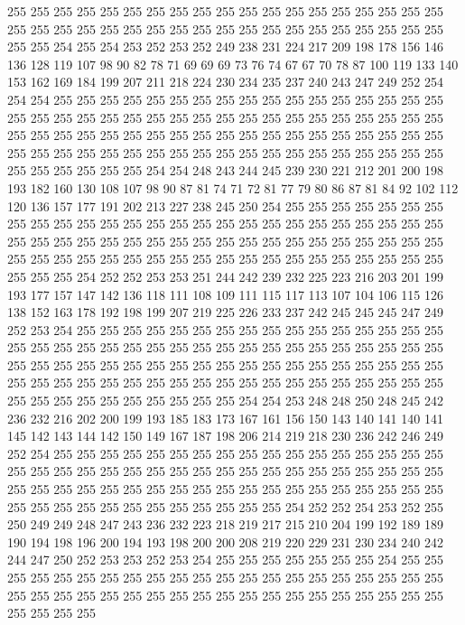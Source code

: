 255 255 255 255 255 255 255 255 255 255 255 255 255 255 255 255 255 255 255 255
255 255 255 255 255 255 255 255 255 255 255 255 255 255 255 255 255 255 255 255
254 255 254 253 252 253 252 249 238 231 224 217 209 198 178 156 146 136 128 119
107 98 90 82 78 71 69 69 69 73 76 74 67 67 70 78 87 100 119 133
140 153 162 169 184 199 207 211 218 224 230 234 235 237 240 243 247 249 252 254
254 254 255 255 255 255 255 255 255 255 255 255 255 255 255 255 255 255 255 255
255 255 255 255 255 255 255 255 255 255 255 255 255 255 255 255 255 255 255 255
255 255 255 255 255 255 255 255 255 255 255 255 255 255 255 255 255 255 255 255
255 255 255 255 255 255 255 255 255 255 255 255 255 255 255 255 255 255 255 255
255 255 254 254 248 243 244 245 239 230 221 212 201 200 198 193 182 160 130 108
107 98 90 87 81 74 71 72 81 77 79 80 86 87 81 84 92 102 112 120
136 157 177 191 202 213 227 238 245 250 254 255 255 255 255 255 255 255 255 255
255 255 255 255 255 255 255 255 255 255 255 255 255 255 255 255 255 255 255 255
255 255 255 255 255 255 255 255 255 255 255 255 255 255 255 255 255 255 255 255
255 255 255 255 255 255 255 255 255 255 255 255 255 255 255 255 255 255 254 252
252 253 253 251 244 242 239 232 225 223 216 203 201 199 193 177 157 147 142 136
118 111 108 109 111 115 117 113 107 104 106 115 126 138 152 163 178 192 198 199
207 219 225 226 233 237 242 245 245 245 247 249 252 253 254 255 255 255 255 255
255 255 255 255 255 255 255 255 255 255 255 255 255 255 255 255 255 255 255 255
255 255 255 255 255 255 255 255 255 255 255 255 255 255 255 255 255 255 255 255
255 255 255 255 255 255 255 255 255 255 255 255 255 255 255 255 255 255 255 255
255 255 255 255 255 255 255 255 255 255 255 255 255 255 255 255 255 255 254 254
253 248 248 250 248 245 242 236 232 216 202 200 199 193 185 183 173 167 161 156
150 143 140 141 140 141 145 142 143 144 142 150 149 167 187 198 206 214 219 218
230 236 242 246 249 252 254 255 255 255 255 255 255 255 255 255 255 255 255 255
255 255 255 255 255 255 255 255 255 255 255 255 255 255 255 255 255 255 255 255
255 255 255 255 255 255 255 255 255 255 255 255 255 255 255 255 255 255 255 255
255 255 255 255 255 255 255 255 255 255 255 255 255 255 254 252 252 254 253 252
255 250 249 249 248 247 243 236 232 223 218 219 217 215 210 204 199 192 189 189
190 194 198 196 200 194 193 198 200 200 208 219 220 229 231 230 234 240 242 244
247 250 252 253 253 252 253 254 255 255 255 255 255 255 255 254 255 255 255 255
255 255 255 255 255 255 255 255 255 255 255 255 255 255 255 255 255 255 255 255
255 255 255 255 255 255 255 255 255 255 255 255 255 255 255 255 255 255 255 255
